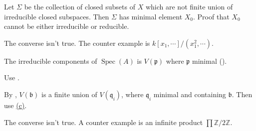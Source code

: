 \begin{exercise}\label{ex6.7}
	Let $\Sigma$ be the collection of closed subsets of $X$ which are not finite union of irreducible closed subspaces. Then $\Sigma$ has minimal element $X_0$. Proof that $X_0$ cannot be either irreducible or reducible.
\end{exercise}

\begin{exercise}\label{ex6.8}
	The converse isn't true. The counter example is $k[x_1,\cdots]/\left(x_1^2,\cdots\right)$.
\end{exercise}

\begin{exercise}\label{ex6.9}
	The irreducible components of $\operatorname{Spec}(A)$ is $V(\mathfrak{p})$ where $\mathfrak{p}$ minimal ().
\end{exercise}

\begin{exercise}\label{ex6.10}
	Use .
\end{exercise}

\begin{exercise}\label{ex6.11}
	By , $V(\mathfrak{b})$ is a finite union of $V(\mathfrak{q}_i)$, where $\mathfrak{q}_i$ minimal and containing $\mathfrak{b}$. Then use \hyperref[ex5.10]{(c)}.
\end{exercise}

\begin{exercise}\label{ex6.12}
	The converse isn't true. A counter example is an infinite product $\prod\mathbb{Z}/2\mathbb{Z}$.
\end{exercise}